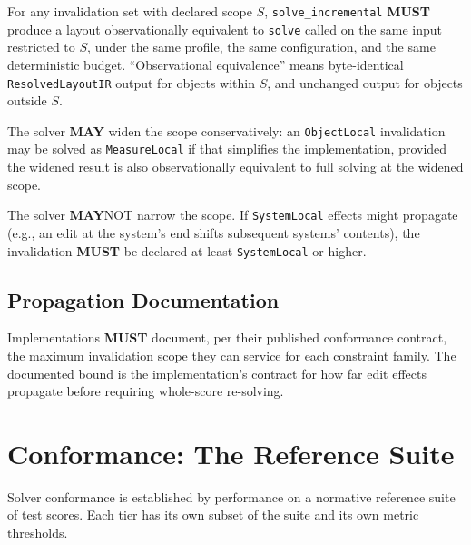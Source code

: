\documentclass[11pt,letterpaper]{report}
\newcounter{requirement}[chapter]
\newcommand{\MUST}{\textbf{MUST}}
\newcommand{\MAY}{\textbf{MAY}}
\begin{document}
\begin{requirement}
  \label{req:solver:incremental-observational-equivalence}
  For any invalidation set with declared scope $S$,
  \texttt{solve\_incremental} \MUST{} produce a layout
  observationally equivalent to \texttt{solve} called on the
  same input restricted to $S$, under the same profile, the same
  configuration, and the same deterministic budget. ``Observational
  equivalence'' means byte-identical \texttt{ResolvedLayoutIR}
  output for objects within $S$, and unchanged output for objects
  outside $S$.

  The solver \MAY{} widen the scope conservatively: an
  \texttt{ObjectLocal} invalidation may be solved as
  \texttt{MeasureLocal} if that simplifies the implementation,
  provided the widened result is also observationally equivalent
  to full solving at the widened scope.

  The solver \MAY NOT{} narrow the scope. If
  \texttt{SystemLocal} effects might propagate (e.g., an edit at
  the system's end shifts subsequent systems' contents), the
  invalidation \MUST{} be declared at least
  \texttt{SystemLocal} or higher.
\end{requirement}

\subsection{Propagation Documentation}

\begin{requirement}
  \label{req:solver:propagation-scope-contract}
  Implementations \MUST{} document, per their published
  conformance contract, the maximum invalidation scope they can
  service for each constraint family. The documented bound is the
  implementation's contract for how far edit effects propagate
  before requiring whole-score re-solving.
\end{requirement}

\section{Conformance: The Reference Suite}
\label{sec:solver:conformance}

Solver conformance is established by performance on a normative
reference suite of test scores. Each tier has its own subset of
the suite and its own metric thresholds.
\end{document}
